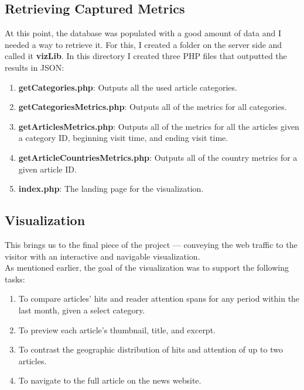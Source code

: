 \documentclass[12pt]{article}
\begin{document}
{\newpage

\subsection{Retrieving Captured Metrics}
At this point, the database was populated with a good amount of data and I needed a way to retrieve it. For this, I created a folder on the server side and called it \textbf{vizLib}. In this directory I created three PHP files that outputted the results in JSON:
\begin{enumerate}
\item{\textbf{getCategories.php}: Outputs all the used article categories.}

\item{\textbf{getCategoriesMetrics.php}: Outputs all of the metrics for all categories.}

\item{\textbf{getArticlesMetrics.php}: Outputs all of the metrics for all the articles given a category ID, beginning visit time, and ending visit time.}

\item{\textbf{getArticleCountriesMetrics.php}: Outputs all of the country metrics for a given article ID.}

\item{\textbf{index.php}: The landing page for the visualization}.

\end{enumerate}

\newpage

\subsection{Visualization}

This brings us to the final piece of the project --- conveying the web traffic to the visitor with an interactive and navigable visualization. \\ As mentioned earlier, the goal of the visualization was to support the following tasks:
\begin{enumerate}
\item To compare articles' hits and reader attention spans for any period within the last month, given a select category.
\item To preview each article's thumbnail, title, and excerpt.
\item To contrast the geographic distribution of hits and attention of up to two articles.
\item To navigate to the full article on the news website.
\end{enumerate}

}
\end{document}
